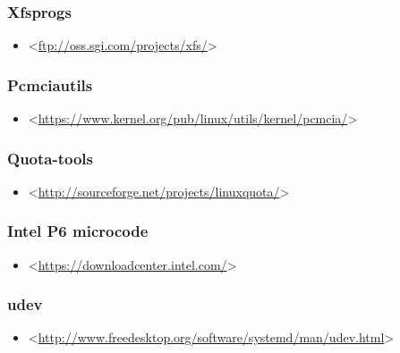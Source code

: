 \documentclass[a4paper,8pt,english]{sphinxmanual}
\begin{document}
\subsubsection{Xfsprogs}
\label{process/changes:id17}\begin{itemize}
\item {} 
\textless{}\href{ftp://oss.sgi.com/projects/xfs/}{ftp://oss.sgi.com/projects/xfs/}\textgreater{}

\end{itemize}


\subsubsection{Pcmciautils}
\label{process/changes:id18}\begin{itemize}
\item {} 
\textless{}\href{https://www.kernel.org/pub/linux/utils/kernel/pcmcia/}{https://www.kernel.org/pub/linux/utils/kernel/pcmcia/}\textgreater{}

\end{itemize}


\subsubsection{Quota-tools}
\label{process/changes:id19}\begin{itemize}
\item {} 
\textless{}\href{http://sourceforge.net/projects/linuxquota/}{http://sourceforge.net/projects/linuxquota/}\textgreater{}

\end{itemize}


\subsubsection{Intel P6 microcode}
\label{process/changes:intel-p6-microcode}\begin{itemize}
\item {} 
\textless{}\href{https://downloadcenter.intel.com/}{https://downloadcenter.intel.com/}\textgreater{}

\end{itemize}


\subsubsection{udev}
\label{process/changes:id20}\begin{itemize}
\item {} 
\textless{}\href{http://www.freedesktop.org/software/systemd/man/udev.html}{http://www.freedesktop.org/software/systemd/man/udev.html}\textgreater{}

\end{itemize}
\end{document}
